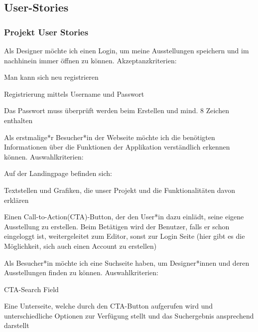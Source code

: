 \subsection{User-Stories}


\subsubsection{Projekt User Stories}
\begin{compactenum}
    \item Als Designer möchte ich einen Login, um meine Ausstellungen speichern und im nachhinein immer öffnen zu können.
    Akzeptanzkriterien: 
    \begin{compactitem}
        \item Man kann sich neu registrieren
        \item Registrierung mittels Username und Passwort
        \item Das Passwort muss überprüft werden beim Erstellen und mind. 8 Zeichen enthalten
    \end{compactitem}  
    \item Als erstmalige*r Besucher*in der Webseite möchte ich die benötigten Informationen über die Funktionen der Applikation verständlich erkennen können. Auswahlkriterien: 
    \begin{compactitem}
        \item Auf der Landingpage befinden sich: 
        \begin{compactitem}
            \item Textstellen und Grafiken, die unser Projekt und die Funktionalitäten davon erklären
            \item Einen Call-to-Action(CTA)-Button, der den User*in dazu einlädt, seine eigene Ausstellung zu erstellen. Beim Betätigen wird der Benutzer, falls er schon eingeloggt ist, weitergeleitet zum Editor, sonst zur Login Seite (hier gibt es die Möglichkeit, sich auch einen Account zu erstellen)
        \end{compactitem}
    \end{compactitem} 
    \item Als Besucher*in möchte ich eine Suchseite haben, um Designer*innen und deren Ausstellungen finden zu können. Auswahlkriterien: 
    \begin{compactitem}
        \item CTA-Search Field
        \item Eine Unterseite, welche durch den CTA-Button aufgerufen wird und unterschiedliche Optionen zur Verfügung stellt und das Suchergebnis ansprechend darstellt

\end{compactitem}
\end{compactenum}
